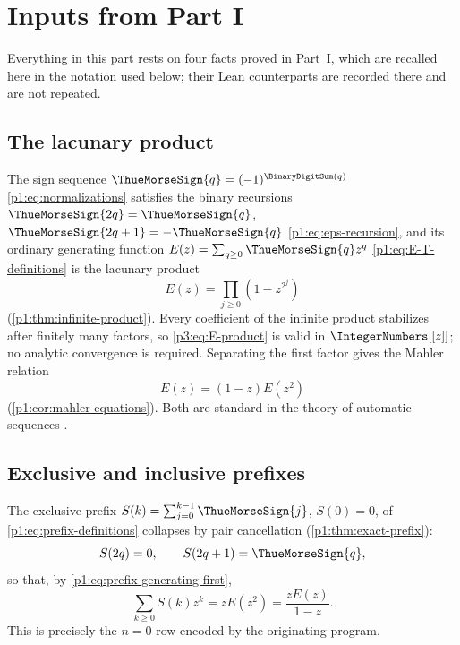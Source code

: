 \documentclass[11pt,oneside]{article}
\numberwithin{equation}{section}
\theoremstyle{definition}
\theoremstyle{remark}
\begin{document}
\section{Inputs from Part I}\label{p3:ch:prefixes}

Everything in this part rests on four facts proved in Part~I, which are
recalled here in the notation used below; their Lean counterparts are
recorded there and are not repeated.

\subsection{The lacunary product}

The sign sequence $\ThueMorseSign{q}=(-1)^{\BinaryDigitSum(q)}$
\eqref{p1:eq:normalizations} satisfies the binary recursions
$\ThueMorseSign{2q}=\ThueMorseSign{q}$,
$\ThueMorseSign{2q+1}=-\ThueMorseSign{q}$ \eqref{p1:eq:eps-recursion}, and
its ordinary generating function
$E(z)=\sum_{q\ge0}\ThueMorseSign{q}z^q$ \eqref{p1:eq:E-T-definitions} is the
lacunary product
\begin{equation}
 E(z)=\prod_{j\ge0}(1-z^{2^j})
 \label{p3:eq:E-product}
\end{equation}
(\cref{p1:thm:infinite-product}).  Every coefficient of the infinite
product stabilizes after finitely many factors, so \eqref{p3:eq:E-product} is
valid in $\IntegerNumbers[[z]]$; no analytic convergence is required.
Separating the first factor gives the Mahler relation
\begin{equation}
 E(z)=(1-z)E(z^2)
 \label{p3:eq:Mahler}
\end{equation}
(\cref{p1:cor:mahler-equations}).  Both are standard in the theory of
automatic sequences \cite{p3:allouche-shallit-book}.

\subsection{Exclusive and inclusive prefixes}

The exclusive prefix $S(k)=\sum_{j=0}^{k-1}\ThueMorseSign{j}$, $S(0)=0$,
of \eqref{p1:eq:prefix-definitions} collapses by pair cancellation
(\cref{p1:thm:exact-prefix}):
\begin{equation}
 S(2q)=0,
 \qquad
 S(2q+1)=\ThueMorseSign{q},
 \label{p3:eq:prefix-collapse}
\end{equation}
so that, by \eqref{p1:eq:prefix-generating-first},
\begin{equation}
 \sum_{k\ge0}S(k)z^k
 =zE(z^2)
 =\frac{zE(z)}{1-z}.
 \label{p3:eq:prefix-gf}
\end{equation}
This is precisely the $n=0$ row encoded by the originating program.
\end{document}

